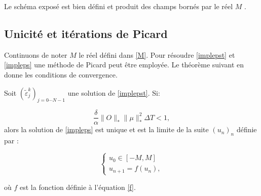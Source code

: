Le schéma exposé est bien défini et produit des champs bornés par le réel $M$ .

\subsection{Unicité et itérations de Picard}
Continuons de noter $M$ le réel défini dans \eqref{M}. Pour résoudre \eqref{implepst} et \eqref{impleps} une méthode de Picard peut être employée. Le théorème suivant en donne les conditions de convergence.

\begin{theorem} \label{theopicard}
	Soit $(\tilde{\varepsilon}_j^k)_{j = 0\cdots N-1}$ une solution de \eqref{implepst}. Si:
	
	\begin{equation} \label{cond2.26}
	\frac{\delta}{\alpha} \lVert O\rVert_* \lVert \mu \rVert^2_* \Delta T < 1,
	\end{equation}
	alors la solution de \eqref{impleps} est unique et est la limite de la suite $(u_n )_n$ définie par :
	
	\begin{equation}
	\begin{cases}
	u_0 \in [-M,M]\\
	u_{n+1} = f(u_n),
	\end{cases}
	\end{equation}
	
	où $f$ est la fonction définie à l'équation \eqref{f}.
	
\end{theorem}

